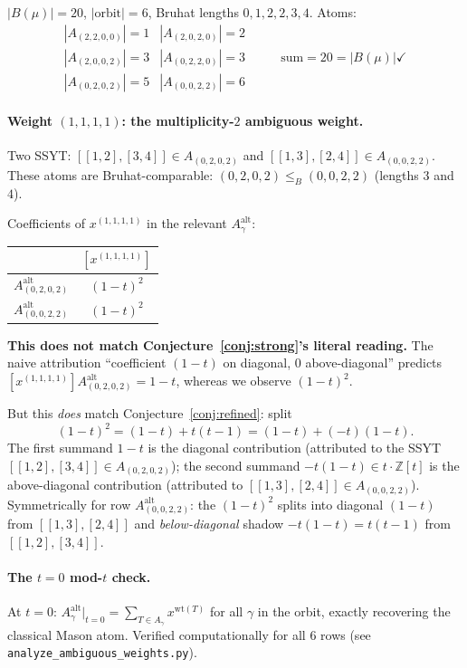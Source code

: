 \documentclass[11pt]{article}
\theoremstyle{definition}
\theoremstyle{remark}
\newcommand{\Aalt}{A^{\mathrm{alt}}}
\newcommand{\wt}{\mathrm{wt}}
\newcommand{\ZZ}{\mathbb{Z}}
\newcommand{\Bru}{\leq_B}
\begin{document}
$|B(\mu)| = 20$, $|\text{orbit}| = 6$, Bruhat lengths $0, 1, 2, 2, 3, 4$.
Atoms:
\[
\begin{array}{ll}
   |A_{(2,2,0,0)}| = 1 & |A_{(2,0,2,0)}| = 2 \\
   |A_{(2,0,0,2)}| = 3 & |A_{(0,2,2,0)}| = 3 \\
   |A_{(0,2,0,2)}| = 5 & |A_{(0,0,2,2)}| = 6
\end{array}
\qquad
\begin{array}{l}
   \text{sum} = 20 = |B(\mu)| \checkmark
\end{array}
\]

\paragraph{Weight $(1,1,1,1)$: the multiplicity-$2$ ambiguous weight.}
Two SSYT: $[[1,2],[3,4]] \in A_{(0,2,0,2)}$ and $[[1,3],[2,4]] \in A_{(0,0,2,2)}$.
These atoms are Bruhat-comparable: $(0,2,0,2) \Bru (0,0,2,2)$
(lengths $3$ and $4$).

Coefficients of $x^{(1,1,1,1)}$ in the relevant $\Aalt_\gamma$:
\begin{center}
\begin{tabular}{r|c}
 & $[x^{(1,1,1,1)}]$ \\
\hline
$\Aalt_{(0,2,0,2)}$ & $(1-t)^2$ \\
$\Aalt_{(0,0,2,2)}$ & $(1-t)^2$
\end{tabular}
\end{center}

\textbf{This does not match Conjecture~\ref{conj:strong}'s literal reading.}
The naive attribution ``coefficient $(1-t)$ on diagonal, $0$ above-diagonal''
predicts $[x^{(1,1,1,1)}]\Aalt_{(0,2,0,2)} = 1 - t$, whereas we observe $(1-t)^2$.

But this \emph{does} match Conjecture~\ref{conj:refined}: split
\[
   (1-t)^2 = (1-t) + t(t-1) = (1-t) + (-t)(1-t).
\]
The first summand $1-t$ is the diagonal contribution (attributed to
the SSYT $[[1,2],[3,4]] \in A_{(0,2,0,2)}$); the second summand
$-t(1-t) \in t \cdot \ZZ[t]$ is the above-diagonal contribution
(attributed to $[[1,3],[2,4]] \in A_{(0,0,2,2)}$).
Symmetrically for row $\Aalt_{(0,0,2,2)}$: the $(1-t)^2$ splits into
diagonal $(1-t)$ from $[[1,3],[2,4]]$ and \emph{below-diagonal} shadow
$-t(1-t) = t(t-1)$ from $[[1,2],[3,4]]$.

\paragraph{The $t = 0$ mod-$t$ check.} At $t=0$:
$\Aalt_\gamma \bigr|_{t=0} = \sum_{T \in A_\gamma} x^{\wt(T)}$
for all $\gamma$ in the orbit, exactly recovering the classical Mason
atom. Verified computationally for all $6$ rows (see
\texttt{analyze\_ambiguous\_weights.py}).
\end{document}
